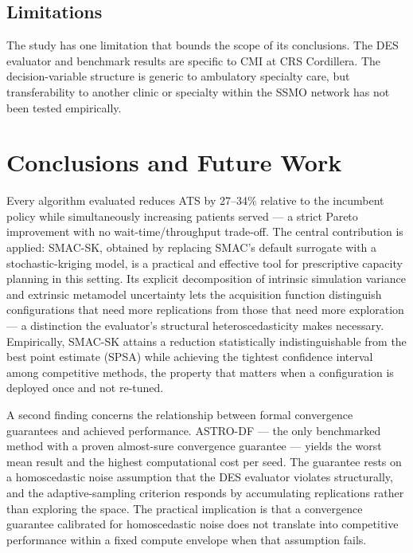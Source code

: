 \documentclass[11pt]{elsarticle}
\begin{document}
\subsection{Limitations}

The study has one limitation that bounds the scope of its conclusions. The DES evaluator and benchmark results are specific to CMI at CRS Cordillera. The decision-variable structure is generic to ambulatory specialty care, but transferability to another clinic or specialty within the SSMO network has not been tested empirically.


\section{Conclusions and Future Work}
\label{sec:conclusions}

Every algorithm evaluated reduces ATS by 27--34\% relative to the incumbent policy while simultaneously increasing patients served — a strict Pareto improvement with no wait-time/throughput trade-off. The central contribution is applied: SMAC-SK, obtained by replacing SMAC's default surrogate with a stochastic-kriging model, is a practical and effective tool for prescriptive capacity planning in this setting. Its explicit decomposition of intrinsic simulation variance and extrinsic metamodel uncertainty lets the acquisition function distinguish configurations that need more replications from those that need more exploration — a distinction the evaluator's structural heteroscedasticity makes necessary. Empirically, SMAC-SK attains a reduction statistically indistinguishable from the best point estimate (SPSA) while achieving the tightest confidence interval among competitive methods, the property that matters when a configuration is deployed once and not re-tuned.

A second finding concerns the relationship between formal convergence guarantees and achieved performance. ASTRO-DF — the only benchmarked method with a proven almost-sure convergence guarantee — yields the worst mean result and the highest computational cost per seed. The guarantee rests on a homoscedastic noise assumption that the DES evaluator violates structurally, and the adaptive-sampling criterion responds by accumulating replications rather than exploring the space. The practical implication is that a convergence guarantee calibrated for homoscedastic noise does not translate into competitive performance within a fixed compute envelope when that assumption fails.
\end{document}
